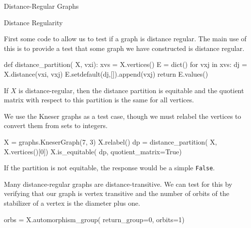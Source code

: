 \begin{chap}{Distance-Regular Graphs}
%
\begin{sect}{Distance Regularity}
%
\begin{para}
First some code to allow us to test if a graph is distance regular.
The main use of this is to provide a test that some graph we have constructed is
distance regular.
\end{para}
%
\begin{sagecode}
\begin{sageinput}
def distance_partition( X, vxi):
    xvs = X.vertices()
    E = dict()
    for vxj in xvs:
        dj = X.distance(vxi, vxj)
        E.setdefault(dj,[]).append(vxj)
    return E.values()    
\end{sageinput}
\end{sagecode}
%    
\begin{para}
If $X$ is distance-regular, then the distance partition is equitable
and the quotient matrix with respect to this partition is the same for all
vertices. 
\end{para}
%
\begin{para}
We use the Kneser graphs as a test case, though we must relabel the vertices to convert them from sets to integers.
\end{para}
%
\begin{sagecode}
\begin{sageinput}
X = graphs.KneserGraph(7, 3)
X.relabel()
dp = distance_partition( X, X.vertices()[0])
X.is_equitable( dp, quotient_matrix=True) 
\end{sageinput}
\begin{sageoutput}
[0 4 0 0]                               
[1 0 3 0]                               
[0 1 0 3]                               
[0 0 2 2]
\end{sageoutput}
\end{sagecode}
%
\begin{para}
If the partition is not equitable, the response would be a simple
\verb|False|.
\end{para}
%
\begin{para}
Many distance-regular graphs are distance-transitive. We can test for this
by verifying that our graph is vertex transitive and the number of
orbits of the stabilizer of a vertex is the diameter plus one.
\end{para}
%
\begin{sagecode}
\begin{sageinput}
orbs = X.automorphism_group( return_group=0, orbits=1)

\end{sageinput}
\end{sagecode}
\end{sect}
\end{chap}
